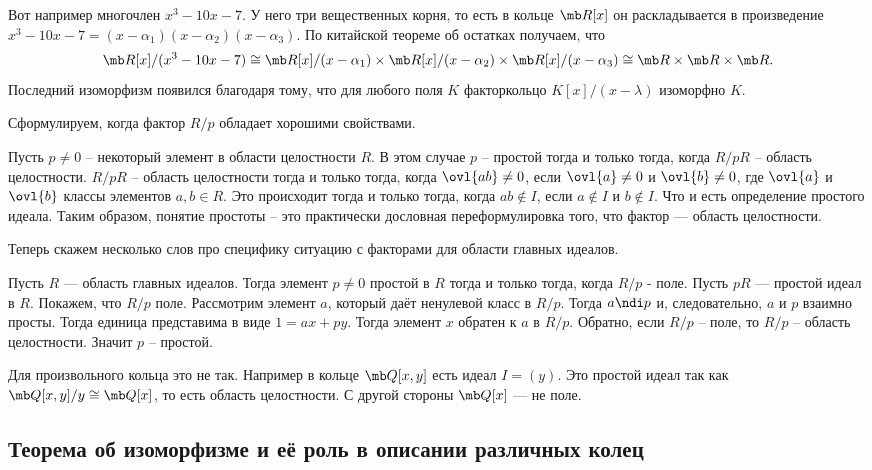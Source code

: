 Вот например многочлен $x^3-10x-7$. У него три вещественных корня, то есть в кольце $\mb R[x]$ он раскладывается в произведение $x^3-10x-7=(x-\alpha_1)(x-\alpha_2)(x-\alpha_3)$. По китайской теореме об остатках получаем, что $$\mb R[x]/(x^3-10x-7) \cong \mb R[x]/(x-\alpha_1)\times \mb R[x]/(x-\alpha_2)\times \mb R[x]/(x-\alpha_3)\cong \mb R\times \mb R\times \mb R.$$
Последний изоморфизм появился благодаря тому, что для любого поля $K$ факторкольцо $K[x]/(x-\lambda)$ изоморфно $K$.






Сформулируем, когда фактор $R/p$ обладает хорошими свойствами.



 Пусть $p\neq 0$ -- некоторый элемент в  области целостности $R$. В этом случае $p$ -- простой тогда и только тогда, когда $R/pR$ -- область целостности.
\proof $R/pR$ -- область целостности тогда и только тогда, когда $\ovl{ab}\neq 0$, если $\ovl{a}\neq 0$ и $\ovl{b} \neq 0$, где $\ovl{a}$ и $\ovl{b}$ классы элементов $a,b \in R$. Это происходит тогда и только тогда, когда $ab\notin I$, если $a\notin I$ и $b\notin I$. Что и есть определение простого идеала. Таким образом, понятие простоты -- это практически дословная переформулировка того, что фактор --- область целостности.
\endproof
\elm



Теперь скажем несколько слов про специфику ситуацию с факторами для области главных идеалов.

\lm Пусть $R$ --- область главных идеалов. Тогда элемент $p\neq 0$ простой в $R$ тогда и только тогда, когда $R/p$ - поле.
\proof Пусть $pR$ --- простой идеал в $R$. Покажем, что $R/p$ поле. Рассмотрим элемент $a$, который даёт ненулевой класс в $R/p$. Тогда $a \ndi p$ и, следовательно, $a$ и $p$ взаимно просты. Тогда единица представима в виде $1=ax+py$. Тогда элемент $x$ обратен к $a$ в $R/p$.
Обратно, если $R/p$ -- поле, то $R/p$ -- область целостности. Значит $p$ -- простой.
\endproof
\elm

\rm Для произвольного кольца это не так. Например в кольце $\mb Q[x,y]$ есть идеал $I=(y)$. Это простой идеал так как $\mb Q[x,y]/y\cong \mb Q[x]$, то есть область целостности. С другой стороны $\mb Q[x]$ --- не поле. 
\erm

\subsection{Теорема об изоморфизме и её роль в описании различных колец}

